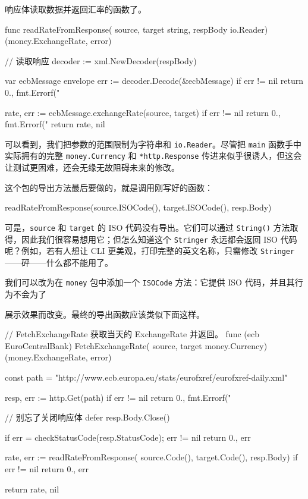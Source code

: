 响应体读取数据并返回汇率的函数了。

\begin{gocode}[title={代码清单 6.46 \texttt{envelope.go}：读取汇率}]
func readRateFromResponse(
    source, target string, respBody io.Reader) (money.ExchangeRate, error) {
    // 读取响应
    decoder := xml.NewDecoder(respBody)

    var ecbMessage envelope
    err := decoder.Decode(&ecbMessage)
    if err != nil {
        return 0., fmt.Errorf("%
    }

    rate, err := ecbMessage.exchangeRate(source, target)
    if err != nil {
        return 0., fmt.Errorf("%
    }
    return rate, nil
}
\end{gocode}

可以看到，我们把参数的范围限制为字符串和 \texttt{io.Reader}。尽管把 \texttt{main} 函数手中实际拥有的完整 \texttt{money.Currency} 和 \texttt{*http.Response} 传进来似乎很诱人，但这会让测试更困难，还会无缘无故阻碍未来的修改。

这个包的导出方法最后要做的，就是调用刚写好的函数：

\begin{gocode}[]
readRateFromResponse(source.ISOCode(), target.ISOCode(), resp.Body)
\end{gocode}

可是，\texttt{source} 和 \texttt{target} 的 ISO 代码没有导出。它们可以通过 \texttt{String()} 方法取得，因此我们很容易想用它；但怎么知道这个 \texttt{Stringer} 永远都会返回 ISO 代码呢？例如，若有人想让 CLI 更美观，打印完整的英文名称，只需修改 \texttt{Stringer}——砰——什么都不能用了。

我们可以改为在 \texttt{money} 包中添加一个 \texttt{ISOCode} 方法：它提供 ISO 代码，并且其行为不会为了

展示效果而改变。最终的导出函数应该类似下面这样。

\begin{gocode}[title={代码清单 6.47 \texttt{ecb.go}：获取汇率}]
// FetchExchangeRate 获取当天的 ExchangeRate 并返回。
func (ecb EuroCentralBank) FetchExchangeRate(
    source, target money.Currency) (money.ExchangeRate, error) {
    const path =
        "http://www.ecb.europa.eu/stats/eurofxref/eurofxref-daily.xml"

    resp, err := http.Get(path)
    if err != nil {
        return 0., fmt.Errorf("%
    }

    // 别忘了关闭响应体
    defer resp.Body.Close()

    if err = checkStatusCode(resp.StatusCode); err != nil {
        return 0., err
    }

    rate, err := readRateFromResponse(
        source.Code(), target.Code(), resp.Body)
    if err != nil {
        return 0., err
    }

    return rate, nil
}
\end{gocode}

